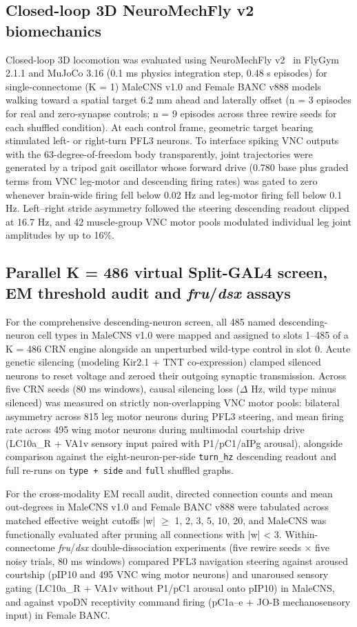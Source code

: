 \documentclass[11pt,a4paper]{article}
\begin{document}
\subsection{Closed-loop 3D NeuroMechFly v2 biomechanics}
Closed-loop 3D locomotion was evaluated using NeuroMechFly v2~\cite{wangchen2024neuromechfly} in FlyGym 2.1.1 and MuJoCo 3.16 (0.1 ms physics integration step, 0.48 s episodes) for single-connectome (K = 1) MaleCNS v1.0 and Female BANC v888 models walking toward a spatial target 6.2 mm ahead and laterally offset (n = 3 episodes for real and zero-synapse controls; n = 9 episodes across three rewire seeds for each shuffled condition). At each control frame, geometric target bearing stimulated left- or right-turn PFL3 neurons. To interface spiking VNC outputs with the 63-degree-of-freedom body transparently, joint trajectories were generated by a tripod gait oscillator whose forward drive (0.780 base plus graded terms from VNC leg-motor and descending firing rates) was gated to zero whenever brain-wide firing fell below 0.02 Hz and leg-motor firing fell below 0.1 Hz. Left--right stride asymmetry followed the steering descending readout clipped at 16.7 Hz, and 42 muscle-group VNC motor pools modulated individual leg joint amplitudes by up to 16\%.

\subsection{Parallel K = 486 virtual Split-GAL4 screen, EM threshold audit and \emph{fru}/\emph{dsx} assays}
For the comprehensive descending-neuron screen, all 485 named descending-neuron cell types in MaleCNS v1.0 were mapped and assigned to slots 1--485 of a K = 486 CRN engine alongside an unperturbed wild-type control in slot 0. Acute genetic silencing (modeling Kir2.1 + TNT co-expression) clamped silenced neurons to reset voltage and zeroed their outgoing synaptic transmission. Across five CRN seeds (80 ms windows), causal silencing loss ($\Delta$ Hz, wild type minus silenced) was measured on strictly non-overlapping VNC motor pools: bilateral asymmetry across 815 leg motor neurons during PFL3 steering, and mean firing rate across 495 wing motor neurons during multimodal courtship drive (LC10a\_R + VA1v sensory input paired with P1/pC1/aIPg arousal), alongside comparison against the eight-neuron-per-side \texttt{turn\_hz} descending readout and full re-runs on \texttt{type + side} and \texttt{full} shuffled graphs.

For the cross-modality EM recall audit, directed connection counts and mean out-degrees in MaleCNS v1.0 and Female BANC v888 were tabulated across matched effective weight cutoffs |w| $\geq$ 1, 2, 3, 5, 10, 20, and MaleCNS was functionally evaluated after pruning all connections with |w| < 3. Within-connectome \emph{fru}/\emph{dsx} double-dissociation experiments (five rewire seeds $\times$ five noisy trials, 80 ms windows) compared PFL3 navigation steering against aroused courtship (pIP10 and 495 VNC wing motor neurons) and unaroused sensory gating (LC10a\_R + VA1v without P1/pC1 arousal onto pIP10) in MaleCNS, and against vpoDN receptivity command firing (pC1a--e + JO-B mechanosensory input) in Female BANC.
\end{document}
